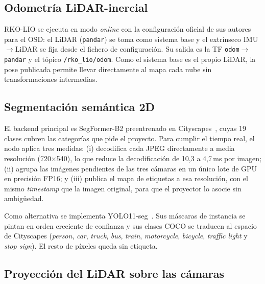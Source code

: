 \documentclass[11pt, twoside]{article}
\begin{document}
\subsection{Odometría LiDAR-inercial}

RKO-LIO se ejecuta en modo \emph{online} con la configuración oficial de sus autores para el OSD: el LiDAR (\texttt{pandar}) se toma como sistema base y el extrínseco IMU$\rightarrow$LiDAR se fija desde el fichero de configuración. Su salida es la TF \texttt{odom}$\rightarrow$\texttt{pandar} y el tópico \texttt{/rko\_lio/odom}. Como el sistema base es el propio LiDAR, la pose publicada permite llevar directamente al mapa cada nube sin transformaciones intermedias.

\subsection{Segmentación semántica 2D}

El backend principal es SegFormer-B2 preentrenado en Cityscapes~\cite{xie2021segformer,cordts2016cityscapes}, cuyas 19 clases cubren las categorías que pide el proyecto. Para cumplir el tiempo real, el nodo aplica tres medidas: (i) decodifica cada JPEG directamente a media resolución (720$\times$540), lo que reduce la decodificación de 10,3 a 4,7\,ms por imagen; (ii) agrupa las imágenes pendientes de las tres cámaras en un único lote de GPU en precisión FP16; y (iii) publica el mapa de etiquetas a esa resolución, con el mismo \emph{timestamp} que la imagen original, para que el proyector lo asocie sin ambigüedad.

Como alternativa se implementa YOLO11-seg~\cite{jocher2024yolo11}. Sus máscaras de instancia se pintan en orden creciente de confianza y sus clases COCO se traducen al espacio de Cityscapes (\emph{person}, \emph{car}, \emph{truck}, \emph{bus}, \emph{train}, \emph{motorcycle}, \emph{bicycle}, \emph{traffic light} y \emph{stop sign}). El resto de píxeles queda sin etiqueta.

\subsection{Proyección del LiDAR sobre las cámaras}
\end{document}
